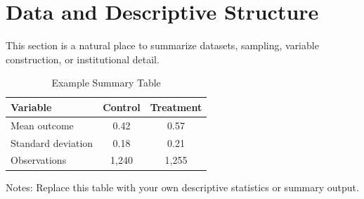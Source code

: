 \section{Data and Descriptive Structure}

This section is a natural place to summarize datasets, sampling, variable construction, or institutional detail.

\begin{table}[H]
  \centering
  \begin{threeparttable}
    \caption{Example Summary Table}
    \begin{tabular}{lcc}
      \toprule
      Variable & Control & Treatment \\
      \midrule
      Mean outcome & 0.42 & 0.57 \\
      Standard deviation & 0.18 & 0.21 \\
      Observations & 1{,}240 & 1{,}255 \\
      \bottomrule
    \end{tabular}
    \begin{tablenotes}[flushleft]
      \footnotesize
      \item Notes: Replace this table with your own descriptive statistics or summary output.
    \end{tablenotes}
  \end{threeparttable}
\end{table}
